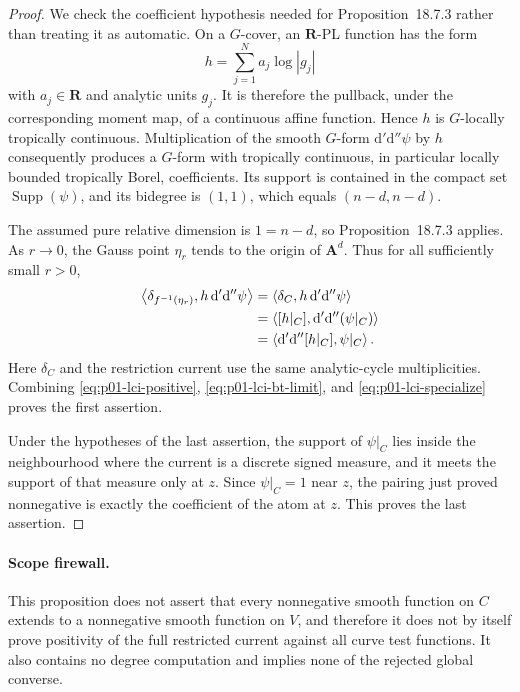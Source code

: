 \begin{proof}
We check the coefficient hypothesis needed for Proposition~18.7.3 rather
than treating it as automatic.  On a $G$-cover, an $\mathbf R$-PL function
has the form
\[
                   h=\sum_{j=1}^N a_j\log|g_j|
\]
with $a_j\in\mathbf R$ and analytic units $g_j$.  It is therefore the
pullback, under the corresponding moment map, of a continuous affine
function.  Hence $h$ is $G$-locally tropically continuous.  Multiplication
of the smooth $G$-form $\mathrm d'\mathrm d''\psi$ by $h$ consequently
produces a $G$-form with tropically continuous, in particular locally
bounded tropically Borel, coefficients.  Its support is contained in the
compact set $\operatorname{Supp}(\psi)$, and its bidegree is $(1,1)$,
which equals $(n-d,n-d)$.

The assumed pure relative dimension is $1=n-d$, so Proposition~18.7.3
applies.  As $r\to0$, the Gauss point $\eta_r$ tends to the origin of
$\mathbf A^d$.  Thus for all sufficiently small $r>0$,
\begin{align}
 \left\langle\delta_{f^{-1}(\eta_r)},
                   h\,\mathrm d'\mathrm d''\psi\right\rangle
 &=\left\langle\delta_C,
                   h\,\mathrm d'\mathrm d''\psi\right\rangle\notag\\
 &=\left\langle[h|_C],
                   \mathrm d'\mathrm d''(\psi|_C)\right\rangle\notag\\
 &=\left\langle\mathrm d'\mathrm d''[h|_C],
                   \psi|_C\right\rangle.
\label{eq:p01-lci-specialize}
\end{align}
Here $\delta_C$ and the restriction current use the same analytic-cycle
multiplicities.  Combining \eqref{eq:p01-lci-positive},
\eqref{eq:p01-lci-bt-limit}, and \eqref{eq:p01-lci-specialize} proves the
first assertion.

Under the hypotheses of the last assertion, the support of $\psi|_C$ lies
inside the neighbourhood where the current is a discrete signed measure,
and it meets the support of that measure only at $z$.  Since
$\psi|_C=1$ near $z$, the pairing just proved nonnegative is exactly the
coefficient of the atom at $z$.  This proves the last assertion.
\end{proof}

\paragraph{Scope firewall.}
This proposition does not assert that every nonnegative smooth function on
$C$ extends to a nonnegative smooth function on $V$, and therefore it does
not by itself prove positivity of the full restricted current against all
curve test functions.  It also contains no degree computation and implies
none of the rejected global converse.
